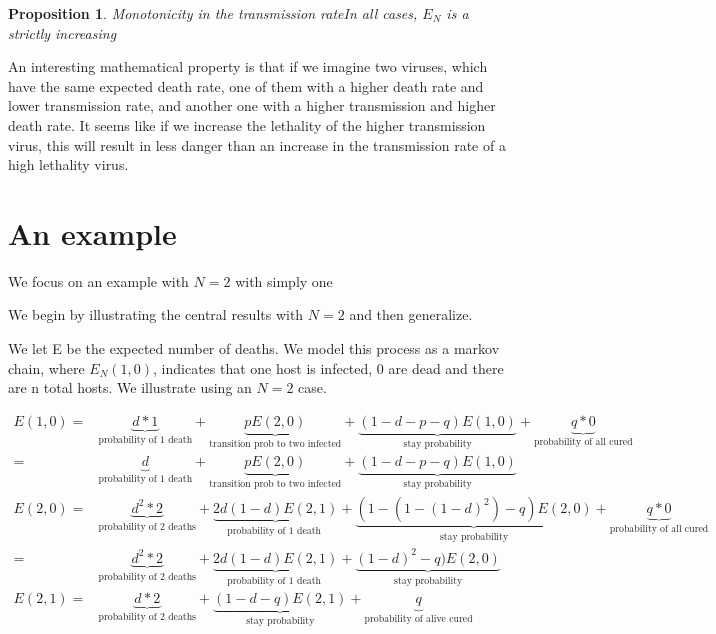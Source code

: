 \documentclass[12pt]{report}
\newtheorem{proposition}{Proposition}
\numberwithin{equation}{section}
\begin{document}
\begin{proposition}{Monotonicity in the transmission rate}\label{prop1}
In all cases, $E_N$ is a strictly increasing 
\end{proposition}

An interesting mathematical property is that if we imagine two viruses, which have the same expected death rate, one of them with a higher death rate and lower transmission rate, and another one with a higher transmission and higher death rate. It seems like if we increase the lethality of the higher transmission virus, this will result in less danger than an increase in the transmission rate of a high lethality virus. 


\section{An example}

We focus on an example with $N=2$ with simply one 


We begin by illustrating the central results with $N=2$ and then generalize. 

We let E be the expected number of deaths. We model this process as a markov chain, where $E_N(1,0)$, indicates that one host is infected, $0$ are dead and there are n total hosts. We illustrate using an $N=2$ case.

\begin{align*}
E(1,0) = &\underbrace{d*1}_\text{probability of 1 death} + 
    \underbrace{pE(2,0) }_\text{transition prob to two infected} +
    \underbrace{(1-d-p-q)E(1,0)}_\text{stay probability} +
    \underbrace{q*0}_\text{probability of all cured} \\
	= &\underbrace{d}_\text{probability of 1 death}+ 
    \underbrace{pE(2,0) }_\text{transition prob to two infected}+ 
    \underbrace{(1-d-p-q)E(1,0)}_\text{stay probability}  \\
E(2,0) = &\underbrace{d^2* 2}_\text{probability of 2 deaths} + 
    \underbrace{2d(1-d)E(2,1) }_\text{probability of 1 death } +
    \underbrace{(1-(1-(1-d)^2)-q)E(2,0) }_\text{stay probability} +
    \underbrace{q*0}_\text{probability of all cured} \\
	   = &\underbrace{d^2* 2}_\text{probability of 2 deaths} + 
    \underbrace{2d(1-d)E(2,1) }_\text{probability of 1 death } +
    \underbrace{(1-d)^2-q)E(2,0) }_\text{stay probability} \\
E(2,1) = &\underbrace{d*2}_\text{probability of 2 deaths} + 
    \underbrace{(1-d-q)E(2,1) }_\text{stay probability} +
    \underbrace{q}_\text{probability of alive cured}
\end{align*}
\end{document}
